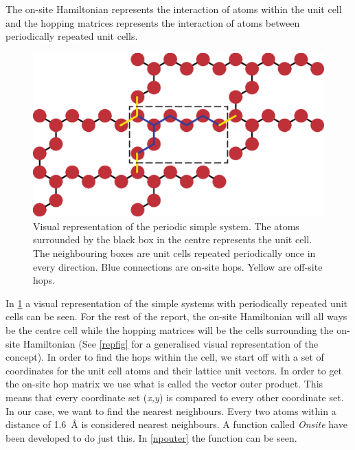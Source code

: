 The on-site Hamiltonian represents the interaction of atoms within the unit cell and the hopping matrices represents the interaction of atoms between periodically repeated unit cells.
\begin{figure}[ht]
	\centering
	\includegraphics[width=.7\textwidth]{Figures/atomreffig.eps}
	\caption{Visual representation of the periodic simple system. The atoms surrounded by the black box in the centre represents the unit cell. The neighbouring boxes are unit cells repeated periodically once in every direction. Blue connections are on-site hops. Yellow are off-site hops.}
	\label{atomrepfig}
\end{figure}
In \cref{atomrepfig} a visual representation of the simple systems with periodically repeated unit cells can be seen. For the rest of the report, the on-site Hamiltonian will all ways be the centre cell while the hopping matrices will be the cells surrounding the on-site Hamiltonian (See \cref{repfig} for a generalised visual representation of the concept).\newline
In order to find the hops within the cell, we start off with a set of coordinates for the unit cell atoms and their lattice unit vectors. In order to get the on-site hop matrix we use what is called the vector outer product. This means that every coordinate set (\textit{x,y}) is compared to every other coordinate set. In our case, we want to find the nearest neighbours. Every two atoms within a distance of \SI{1.6}{\angstrom} is considered nearest neighbours. A function called \textit{Onsite} have been developed to do just this. In \cref{npouter} the function can be seen.
\vspace{-1\baselineskip}
\vspace{\baselineskip}
